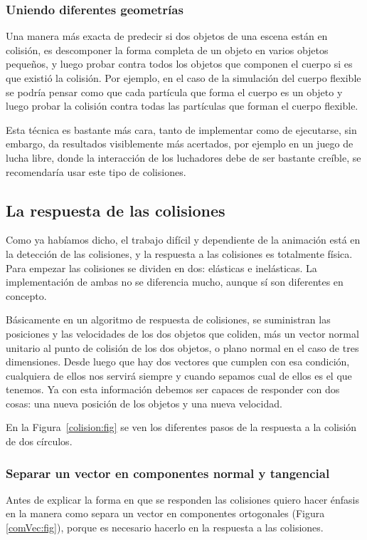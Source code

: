 \subsubsection{Uniendo diferentes geometrías}
Una manera más exacta de predecir si dos objetos de una escena están en colisión, es descomponer la forma completa de un objeto en varios objetos pequeños, y luego probar contra todos los objetos que componen el cuerpo si es que existió la colisión.
Por ejemplo, en el caso de la simulación del cuerpo flexible se podría pensar como que cada partícula que forma el cuerpo es un objeto y luego probar la colisión contra todas las partículas que forman el cuerpo flexible.

Esta técnica es bastante más cara, tanto de implementar como de ejecutarse, sin embargo, da resultados visiblemente más acertados, por ejemplo en un juego de lucha libre, donde la interacción de los luchadores debe de ser bastante creíble, se recomendaría usar este tipo de colisiones.

\subsection{La respuesta de las colisiones}

Como ya habíamos dicho, el trabajo difícil y dependiente de la animación está en la detección de las colisiones, y la respuesta a las colisiones es totalmente física.
Para empezar las colisiones se dividen en dos: elásticas e inelásticas.
La implementación de ambas no se diferencia mucho, aunque sí son diferentes en concepto.

Básicamente en un algoritmo de respuesta de colisiones, se suministran las posiciones y las velocidades de los dos objetos que coliden, más un vector normal unitario al punto de colisión de los dos objetos, o plano normal en el caso de tres dimensiones.
Desde luego que hay dos vectores que cumplen con esa condición, cualquiera de ellos nos servirá siempre y cuando sepamos cual de ellos es el que tenemos.
Ya con esta información debemos ser capaces de responder con dos cosas: una nueva posición de los objetos y una nueva velocidad.

En la Figura~\ref{colision:fig} se ven los diferentes pasos de la respuesta a la colisión de dos círculos.


\subsubsection{Separar un vector en componentes normal y tangencial}
Antes de explicar la forma en que se responden las colisiones quiero hacer énfasis en la manera como separa un vector en componentes ortogonales (Figura \ref{comVec:fig}), porque es necesario hacerlo en la respuesta a las colisiones.

